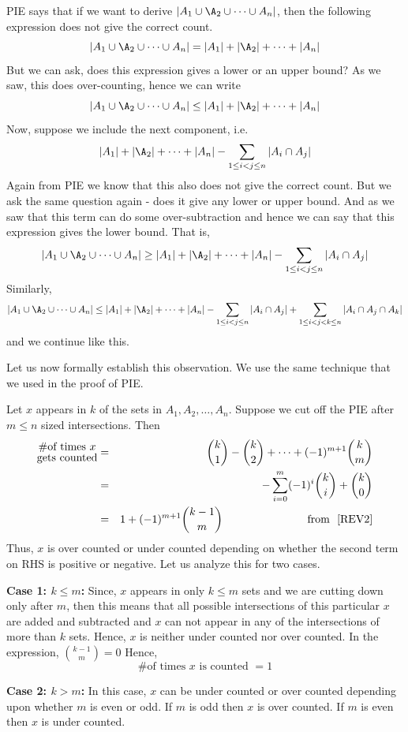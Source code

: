 PIE says that if we want to derive $|A_1\cup\A_2\cup\cdots\cup A_n|$, then the following expression does not give the correct count.
$$|A_1\cup\A_2\cup\cdots\cup A_n| = |A_1|+|\A_2|+\cdots+|A_n|$$ 
But we can ask, does this expression gives a lower or an upper bound? As we saw, this does over-counting, hence we can write
$$|A_1\cup\A_2\cup\cdots\cup A_n| \le |A_1|+|\A_2|+\cdots+|A_n|$$
Now, suppose we include the next component, i.e. $$|A_1|+|\A_2|+\cdots+|A_n|-\sum_{1\le i<j\le n}|A_i\cap A_j|$$
Again from PIE we know that this also does not give the correct count. But we ask the same question again - does it give any lower or upper bound. And as we saw that this term can do some over-subtraction and hence we can say that this expression gives the lower bound. That is, 
$$|A_1\cup\A_2\cup\cdots\cup A_n| \ge |A_1|+|\A_2|+\cdots+|A_n|-\sum_{1\le i<j\le n}|A_i\cap A_j|$$
Similarly, 
$$|A_1\cup\A_2\cup\cdots\cup A_n| \le |A_1|+|\A_2|+\cdots+|A_n|-\sum_{1\le i<j\le n}|A_i\cap A_j|+\sum_{1\le i<j<k\le n}|A_i\cap A_j\cap A_k|$$
and we continue like this. 

Let us now formally establish this observation. We use the same technique that we used in the proof of PIE. 

Let $x$ appears in $k$ of the sets in $A_1, A_2, \ldots, A_n$. Suppose we cut off the PIE after $m\le n$ sized intersections. Then 
\begin{eqnarray*} 
{\Large\substack{\# \text{of times $x$}\\ \text{gets counted}}} &=& {k\choose 1}-{k\choose 2}+\cdots+(-1)^{m+1}{k\choose m}\\
&=&-\sum_{i=0}^m(-1)^{i}{k\choose i}+{k\choose 0}\\
&=& 1+(-1)^{m+1}{k-1\choose m} ~~~~~~~~~~~~~~~~~~~~~~~\text{from ~\eqref{REV2}}
\end{eqnarray*}
Thus, $x$ is over counted or under counted depending on whether the second term on RHS is positive or negative. Let us analyze this for two cases.
\begin{description}
\item{\bf Case 1: $k\le m$:}
Since, $x$ appears in only $k\le m$ sets and we are cutting down only after $m$, then this means that all possible intersections of this particular $x$ are added and subtracted and $x$ can not appear in any of the intersections of more than $k$ sets. Hence, $x$ is neither under counted nor over counted. In the expression, ${k-1\choose m} = 0$ Hence,
$$\# \text{of times $x$ is counted } = 1$$
\item{\bf Case 2: $k>m$:} In this case, $x$ can be under counted or over counted depending upon whether $m$ is even or odd. If $m$ is odd then $x$ is over counted. If $m$ is even then $x$ is under counted.
\end{description}

